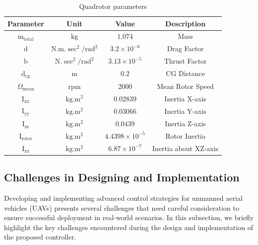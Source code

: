\documentclass[3p]{elsarticle}
\begin{document}
\begin{table}[H]
    \centering
    \caption{Quadrotor parameters}
    \vspace{-0.5cm}
    \renewcommand{\arraystretch}{1.3}
    \begin{center}
    \begin{tabular}{cccc}
    \hline
    Parameter & Unit & Value & Description \\
    \hline
    $\mathrm{m}_{\text{total}}$ & $\mathrm{kg}$ & $1.074$ & Mass \\ 
    $\mathrm{d}$ & $\mathrm{N.m.\sec^2/rad^2}$ & $3.2\times10^{-6}$ & Drag Factor \\
    $\mathrm{b}$ & $\mathrm{N.\sec^2/rad^2}$ & $3.13\times10^{-5}$ & Thrust Factor \\
    $\mathrm{d}_{\text{cg}}$ & $\mathrm{m}$ & $0.2$ & CG Distance \\
    $\Omega_{\text{mean}}$ & $\mathrm{rpm}$ & $2000$ & Mean Rotor Speed \\
    \hline
    $\mathrm{I}_{\text{xx}}$ & $\mathrm{kg.m^2}$ & $0.02839$ & Inertia X-axis \\
    $\mathrm{I}_{\text{yy}}$ & $\mathrm{kg.m^2}$ & $0.03066$ & Inertia Y-axis \\
    $\mathrm{I}_{\text{zz}}$ & $\mathrm{kg.m^2}$ & $0.0439$ & Inertia Z-axis \\
    $\mathrm{I}_{\text{rotor}}$ & $\mathrm{kg.m^2}$ & $4.4398\times 10^{-5}$ & Rotor Inertia \\
    $\mathrm{I}_{\text{xz}}$ & $\mathrm{kg.m^2}$ & $6.87\times 10^{-7}$ & Inertia about XZ-axis \\
    \hline
\end{tabular}
\label{tab:parameters}
\end{center}
\end{table}


\subsection{Challenges in Designing and Implementation}

\noindent Developing and implementing advanced control strategies for unmanned aerial vehicles (UAVs) presents several challenges that need careful consideration to ensure successful deployment in real-world scenarios. In this subsection, we briefly highlight the key challenges encountered during the design and implementation of the proposed controller.
\end{document}
